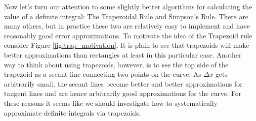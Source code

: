 Now let's turn our attention to some slightly better algorithms for calculating the value
of a definite integral: The Trapezoidal Rule and Simpson's Rule.  There are many others,
but in practice these two are relatively easy to implement and have reasonably good error
approximations.  To motivate the idea of the Trapezoid rule consider Figure
\ref{fig:trap_motivation}.  It is plain to see that trapezoids will make better
approximations than rectangles at least in this particular case.  Another way to think
about using trapezoids, however, is to see the top side of the trapezoid as a secant line
connecting two points on the curve.  As $\Delta x$ gets arbitrarily small, the secant
lines become better and better approximations for tangent lines and are hence arbitrarily
good approximations for the curve.  For these reasons it seems like we should investigate
how to systematically approximate definite integrals via trapezoids.

